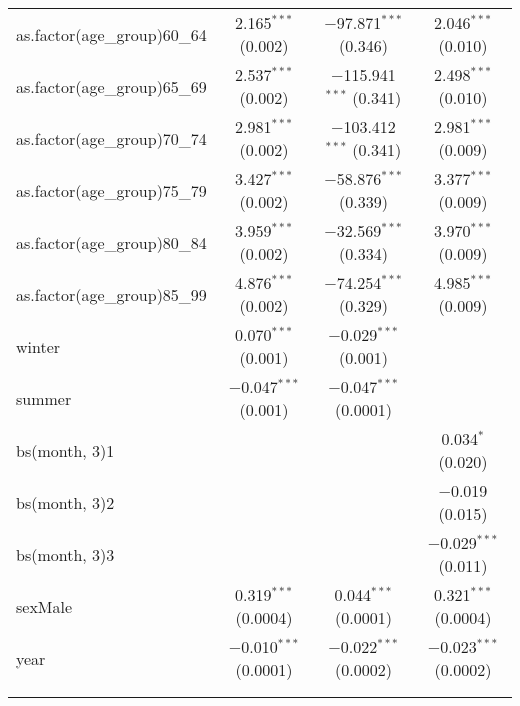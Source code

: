 \begin{table}[!htbp]
\begin{tabular}{@{\extracolsep{5pt}}lccc}
  as.factor(age\_group)60\_64 & 2.165$^{***}$ (0.002) & $-$97.871$^{***}$ (0.346) & 2.046$^{***}$ (0.010) \\ 
  as.factor(age\_group)65\_69 & 2.537$^{***}$ (0.002) & $-$115.941$^{***}$ (0.341) & 2.498$^{***}$ (0.010) \\ 
  as.factor(age\_group)70\_74 & 2.981$^{***}$ (0.002) & $-$103.412$^{***}$ (0.341) & 2.981$^{***}$ (0.009) \\ 
  as.factor(age\_group)75\_79 & 3.427$^{***}$ (0.002) & $-$58.876$^{***}$ (0.339) & 3.377$^{***}$ (0.009) \\ 
  as.factor(age\_group)80\_84 & 3.959$^{***}$ (0.002) & $-$32.569$^{***}$ (0.334) & 3.970$^{***}$ (0.009) \\ 
  as.factor(age\_group)85\_99 & 4.876$^{***}$ (0.002) & $-$74.254$^{***}$ (0.329) & 4.985$^{***}$ (0.009) \\ 
  winter & 0.070$^{***}$ (0.001) & $-$0.029$^{***}$ (0.001) &  \\ 
  summer & $-$0.047$^{***}$ (0.001) & $-$0.047$^{***}$ (0.0001) &  \\ 
  bs(month, 3)1 &  &  & 0.034$^{*}$ (0.020) \\ 
  bs(month, 3)2 &  &  & $-$0.019 (0.015) \\ 
  bs(month, 3)3 &  &  & $-$0.029$^{***}$ (0.011) \\ 
  sexMale & 0.319$^{***}$ (0.0004) & 0.044$^{***}$ (0.0001) & 0.321$^{***}$ (0.0004) \\ 
  year & $-$0.010$^{***}$ (0.0001) & $-$0.022$^{***}$ (0.0002) & $-$0.023$^{***}$ (0.0002) \\ 
 \hline \\[-1.8ex] 
\hline 
\hline \\[-1.8ex] 
\end{tabular} 
\end{table} 
